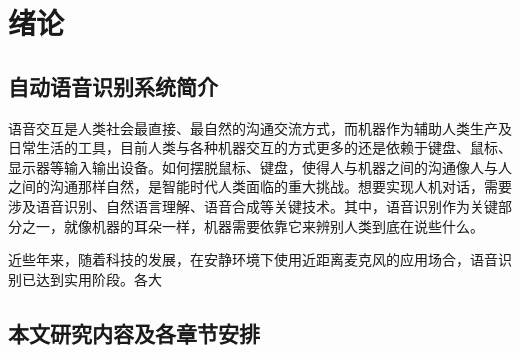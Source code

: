 ﻿%
\chapter{绪论}

\section{自动语音识别系统简介}
语音交互是人类社会最直接、最自然的沟通交流方式，而机器作为辅助人类生产及日常生活的工具，目前人类与各种机器交互的方式更多的还是依赖于键盘、鼠标、显示器等输入输出设备。如何摆脱鼠标、键盘，使得人与机器之间的沟通像人与人之间的沟通那样自然，是智能时代人类面临的重大挑战。想要实现人机对话，需要涉及语音识别、自然语言理解、语音合成等关键技术。其中，语音识别作为关键部分之一，就像机器的耳朵一样，机器需要依靠它来辨别人类到底在说些什么。

近些年来，随着科技的发展，在安静环境下使用近距离麦克风的应用场合，语音识别已达到实用阶段。各大
\section{本文研究内容及各章节安排}
